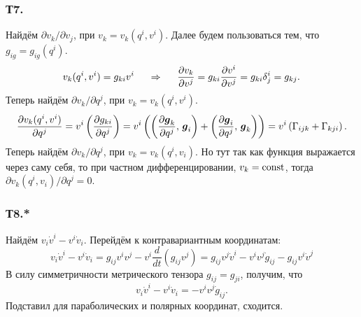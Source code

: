 \subsubsection*{Т7.}
Найдём $\partial v_k / \partial v_j$, при $v_k = v_k(q^i, v^i)$. Далее будем пользоваться тем, что $g_{ig} = g_{ig}(q^i)$.
$$
    v_k(q^i, v^i) = g_{ki} v^i 
    \hspace{0.5cm} \Rightarrow \hspace{0.5cm} 
    \frac{\partial v_k}{\partial v^j} = g_{ki} \frac{\partial v^i}{\partial v^j} = g_{ki} \delta^i_j = g_{kj}.
$$
Теперь найдём $\partial v_k / \partial q^j$, при $v_k = v_k(q^i, v^i)$. 
$$
    \frac{\partial v_k(q^i, v^i)}{\partial q^j} = v^i \left(
        \frac{\partial  g_{ki}}{\partial q^j} 
    \right) = v^i \left(
        \left(\frac{\partial \mbox{\boldmath $g$}_k}{\partial q^j}, \, \mbox{\boldmath $g$}_i \right) +
        \left(\frac{\partial \mbox{\boldmath $g$}_i}{\partial q^j}, \, \mbox{\boldmath $g$}_k\right)
    \right) = v^i\left(\Gamma_{ijk} + \Gamma_{kji}\right).
$$
Теперь найдём $\partial v_k / \partial q^j$, при $v_k = v_k(q^i, v_i)$. Но тут так как функция выражается через саму себя, то при частном дифференцировании, $v_k = \text{const}$, тогда $\partial v_k(q^i, v_i) / \partial q^j = 0$.



\subsubsection*{Т8.*}
Найдём $v_i \dot{v}^i - v^i \dot{v}_i$. Перейдём к контравариантным координатам:
$$
    v_i \dot{v}^i - v^i \dot{v}_i = g_{ij} v^i v^j - v^i \frac{d}{dt} \left(
             g_{ij} v^j
        \right) =    g_{ij} v^j \dot{v}^i  - v^i v^j \dot{g}_{ij} - g_{ij} v^i \dot{v}^j
$$
В силу симметричности метрического тензора $g_{ij}=g_{ji}$, получим, что
$$
    v_i \dot{v}^i - v^i \dot{v}_i =  - v^i v^j \dot{g}_{ij}.
$$
Подставил для параболических и полярных координат, сходится.
